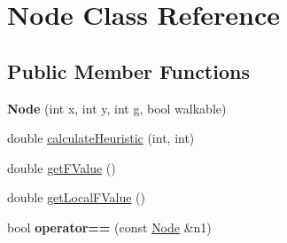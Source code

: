 \hypertarget{class_node}{}\section{Node Class Reference}
\label{class_node}
\subsection*{Public Member Functions}
\begin{DoxyCompactItemize}
\item 
\hypertarget{class_node_a167857e82d68aecf75c74e0125ea3edb}{}{\bfseries Node} (int x, int y, int g, bool walkable)\label{class_node_a167857e82d68aecf75c74e0125ea3edb}

\item 
double \hyperlink{class_node_a5c4279782a1ae22a873e5b9d0c004124}{calculate\+Heuristic} (int, int)
\item 
double \hyperlink{class_node_a1e56091a513706cd12fe58ed5b9d7290}{get\+F\+Value} ()
\item 
double \hyperlink{class_node_a9c693e514c631c04ab72dc35ae5fedeb}{get\+Local\+F\+Value} ()
\item 
\hypertarget{class_node_aef58459d6e69d9e2eb7e6f154a4d8b62}{}bool {\bfseries operator==} (const \hyperlink{class_node}{Node} \&n1)\label{class_node_aef58459d6e69d9e2eb7e6f154a4d8b62}

\end{DoxyCompactItemize}
